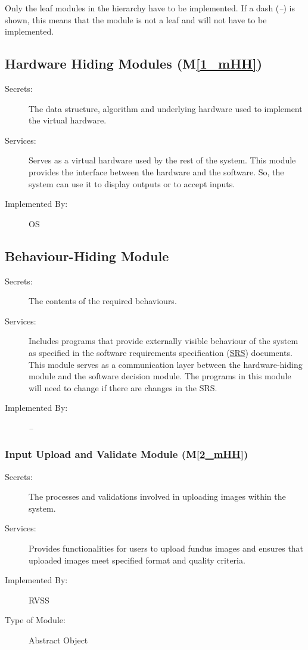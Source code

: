 \documentclass[12pt, titlepage]{article}
\newcommand{\mref}[1]{M\ref{#1}}
\begin{document}
Only the leaf modules in the hierarchy have to be implemented. If a dash (\emph{--}) is shown, this means that the module is not a leaf and will not have to be implemented.

\subsection{Hardware Hiding Modules (\mref{1_mHH})}

\begin{description}
\item[Secrets:]The data structure, algorithm and underlying hardware used to implement the virtual hardware.
\item[Services:]Serves as a virtual hardware used by the rest of the system. This module provides the interface between the hardware and the software. So, the system can use it to display outputs or to accept inputs.
\item[Implemented By:] OS
\end{description}


\subsection{Behaviour-Hiding Module}

\begin{description}
\item[Secrets:]The contents of the required behaviours.
\item[Services:]Includes programs that provide externally visible behaviour of the system as specified in the software requirements specification (\href{https://github.com/lele0007/Blood-vessel-segmentation/blob/main/docs/SRS/SRS.pdf}{SRS}) documents. This module serves as a communication layer between the hardware-hiding module and the software decision module. The programs in this module will need to change if there are changes in the SRS.
\item[Implemented By:] \emph{--}
\end{description}

\subsubsection{Input Upload and Validate Module (\mref{2_mHH})}
\begin{description}
\item[Secrets:] The processes and validations involved in uploading images within the system.
\item[Services:] Provides functionalities for users to upload fundus images and ensures that uploaded images meet specified format and quality criteria.
\item[Implemented By:] RVSS
\item[Type of Module:] Abstract Object
\end{description}
\end{document}
